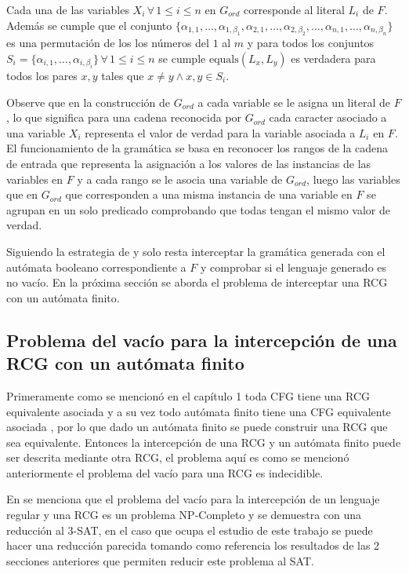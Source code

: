 \documentclass[12pt]{article}
\begin{document}
Cada una de las variables $X_i\,\forall\,1\leq i\leq n$ en $G_{ord}$ corresponde al literal $L_i$ de $F$.
Además se cumple que el conjunto $\{\alpha_{1,1},\ldots,\alpha_{1,\beta_1},\alpha_{2,1},\ldots,
    \alpha_{2,\beta_2},\ldots,\alpha_{n,1},\ldots,\alpha_{n,\beta_n}\}$ es una permutación de los los números del
$1$ al $m$ y para todos los conjuntos $S_i=\{\alpha_{i,1},\ldots,\alpha_{i,\beta_i}\}\,\forall\,1\leq i\leq n$ se cumple
$\text{equals}(L_x,L_y)$ es verdadera para todos los pares $x, y$ tales que $x\neq y \wedge x,y\in S_i$.

Observe que en la construcción de $G_{ord}$ a cada variable se le asigna un literal de $F$, lo que significa
para una cadena reconocida por $G_{ord}$ cada caracter asociado a una variable $X_i$ representa el valor de verdad
para la variable asociada a $L_i$ en $F$. El funcionamiento de la gramática se basa en reconocer los rangos de la cadena
de entrada que representa la asignación a los valores de las instancias de las variables en $F$ y a cada rango se le asocia
una variable de $G_{ord}$, luego las variables que en $G_{ord}$ que corresponden a una misma instancia de una variable en
$F$ se agrupan en un solo predicado comprobando que todas tengan el mismo valor de verdad.

Siguiendo la estrategia de \cite{aCFSAT} y \cite{aSRCSAT} solo resta interceptar la gramática generada con el autómata
booleano correspondiente a $F$ y comprobar si el lenguaje generado es no vacío. En la próxima sección se aborda el problema de interceptar una RCG con un autómata finito.

\subsection{Problema del vacío para la intercepción de una RCG con un autómata finito}

Primeramente como se mencionó en el capítulo 1 toda CFG tiene una RCG equivalente asociada y a su vez todo autómata finito tiene una
CFG equivalente asociada \cite{authomataTheory}, por lo que dado un autómata finito se puede construir una RCG que sea equivalente.
Entonces la intercepción de una RCG y un autómata finito puede ser descrita mediante otra RCG, el problema aquí es como se mencionó
anteriormente el problema del vacío para una RCG es indecidible.

En \cite{propertiesRCGBib1} se menciona que el problema del vacío para la intercepción de un lenguaje regular y una RCG es un
problema NP-Completo y se demuestra con una reducción al 3-SAT, en el caso que ocupa el estudio de este trabajo se puede
hacer una reducción parecida tomando como referencia los resultados de las 2 secciones anteriores que permiten reducir este problema
al SAT.
\end{document}
